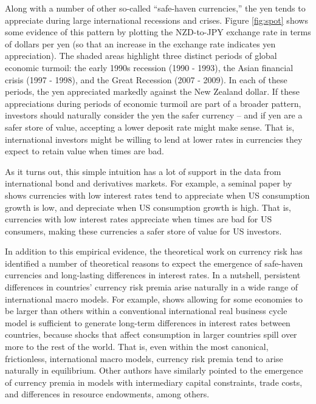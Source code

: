 \documentclass{ar-1col}
\begin{document}
Along with a number of other so-called ``safe-haven currencies,'' the yen tends to appreciate during large international recessions and crises. Figure \ref{fig:spot} shows some evidence of this pattern by plotting the NZD-to-JPY exchange rate in terms of dollars per yen (so that an increase in the exchange rate indicates yen appreciation). The shaded areas highlight three distinct periods of global economic turmoil: the early 1990s recession (1990 - 1993), the Asian financial crisis (1997 - 1998), and the Great Recession (2007 - 2009). In each of these periods, the yen appreciated markedly against the New Zealand dollar. If these appreciations during periods of economic turmoil are part of a broader pattern, investors should naturally consider the yen the safer currency -- and if yen are a safer store of value, accepting a lower deposit rate might make sense. That is, international investors might be willing to lend at lower rates in currencies they expect to retain value when times are bad.

As it turns out, this simple intuition has a lot of support in the data from international bond and derivatives markets. For example, a seminal paper by \citet{LustigVerdelhan2007} shows currencies with low interest rates tend to appreciate when US consumption growth is low, and depreciate when US consumption growth is high. That is, currencies with low interest rates appreciate when times are bad for US consumers, making these currencies a safer store of value for US investors.

In addition to this empirical evidence, the theoretical work on currency risk has identified a number of theoretical reasons to expect the emergence of safe-haven currencies and long-lasting differences in interest rates. In a nutshell, persistent differences in countries' currency risk premia arise naturally in a wide range of international macro models. For example, \citet{Hassan2013} shows allowing for some economies to be larger than others within a conventional international real business cycle model is sufficient to generate long-term differences in interest rates between countries, because shocks that affect consumption in larger countries spill over more to the rest of the world. That is, even within the most canonical, frictionless, international macro models, currency risk premia tend to arise naturally in equilibrium. Other authors have similarly pointed to the emergence of currency premia in models with intermediary capital constraints, trade costs, and differences in resource endowments, among others.
\end{document}
